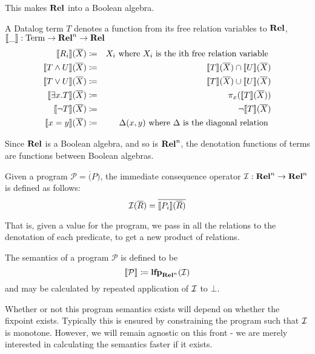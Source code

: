This makes $\mathbf{Rel}$ into a Boolean algebra.

\begin{defn}
  A Datalog term $T$ denotes a function from its free relation variables to
  $\mathbf{Rel}$, $\llbracket \_ \rrbracket : \mathrm{Term} \rightarrow \mathbf{Rel}^n \rightarrow \mathbf{Rel}$
  \begin{eqnarray*}
    \llbracket R_i \rrbracket(\overline{X}) &\coloneqq& X_i \text{ where } X_i \text { is the ith free relation variable }\\
    \llbracket T \wedge U \rrbracket(\overline{X}) &\coloneqq& \llbracket T \rrbracket(\overline{X}) \cap  \llbracket U \rrbracket(\overline{X})\\
    \llbracket T \vee U \rrbracket(\overline{X}) &\coloneqq& \llbracket T \rrbracket(\overline{X}) \cup  \llbracket U \rrbracket(\overline{X})\\
    \llbracket \exists x. T \rrbracket(\overline{X}) &\coloneqq& \pi_x(\llbracket T \rrbracket(\overline{X}))\\
    \llbracket \neg T \rrbracket(\overline{X}) &\coloneqq& \neg \llbracket T \rrbracket(\overline{X})\\
    \llbracket x=y \rrbracket(\overline{X}) &\coloneqq& \Delta(x, y) \text{ where } \Delta \text{ is the diagonal relation }
  \end{eqnarray*}
\end{defn}

Since $\mathbf{Rel}$ is a Boolean algebra, and so is $\mathbf{Rel}^n$, the denotation
functions of terms are functions between Boolean algebras.

\begin{defn}
  Given a program $\mathcal{P} = \overline(P)$, the immediate consequence operator $\mathcal{I}: \mathbf{Rel}^n \rightarrow \mathbf{Rel}^n$ is defined as follows:
  $$\mathcal{I}(\overline{R}) = \overline{\llbracket P_i \rrbracket(\overline{R})}$$
\end{defn}

That is, given a value for the program, we pass in all the relations
to the denotation of each predicate, to get a new product of relations.

\begin{defn}
  The semantics of a program $\mathcal{P}$ is defined to be 
  $$\llbracket \mathcal{P} \rrbracket \coloneqq \textbf{lfp}_{\mathbf{Rel}^n}(\mathcal{I})$$
  and may be calculated by repeated application of $\mathcal{I}$ to $\bot$.
\end{defn}

Whether or not this program semantics exists will depend on whether the fixpoint
exists. Typically this is ensured by constraining the program such that $\mathcal{I}$
is monotone. However, we will remain agnostic on this front - we are merely
interested in calculating the semantics faster if it exists.


